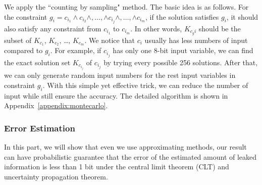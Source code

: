 We apply the ``counting by sampling" method. The basic idea is as follows. For
the constraint $g_{i}= c_{i_1} \land c_{i_2} \land ,\ldots, \land c_{i_j} \land
,\ldots, \land c_{i_m}$, if the solution satisfies $g_{i}$, it should also
satisfy any constraint from $c_{i_1}$ to $c_{i_m}$. In other words, $K_{c_gi}$
should be the subset of $K_{c_1}$, $K_{c_2}$, \ldots , $K_{c_m}$. We notice that
$c_i$ usually has less numbers of input compared to $g_{i}$. For example, if
$c_{i_j}$ has only one 8-bit input variable, we can find the exact solution set
$K_{c_{i_j}}$ of $c_{i_j}$ by trying every possible 256 solutions. After that,
we can only generate random input numbers for the rest input variables in
constraint $g_{i}$. With this simple yet effective trick, we can reduce the number of input
while still ensure the accuracy.
The detailed algorithm is shown in Appendix~\ref{appendix:montecarlo}.




\subsubsection{Error Estimation}
\label{sssec:errest}
In this part, we will show that even we use approximating methods, our result
can have probabilistic guarantee that the error of the estimated amount of leaked 
information is less than 1 bit under the central limit theorem (CLT) and uncertainty
propagation theorem.

